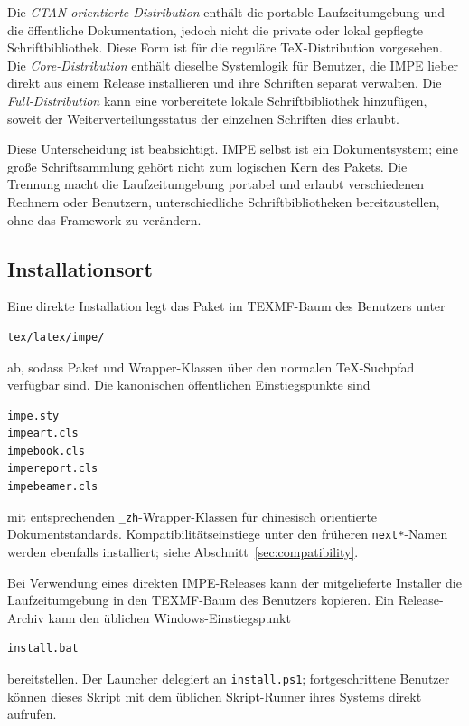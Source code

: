 \documentclass[11pt]{impeart}
\begin{document}
Die \emph{CTAN-orientierte Distribution} enthält die portable Laufzeitumgebung
und die öffentliche Dokumentation, jedoch nicht die private oder lokal
gepflegte Schriftbibliothek. Diese Form ist für die reguläre
\TeX{}-Distribution vorgesehen. Die \emph{Core-Distribution} enthält dieselbe
Systemlogik für Benutzer, die IMPE lieber direkt aus einem Release installieren
und ihre Schriften separat verwalten. Die \emph{Full-Distribution} kann eine
vorbereitete lokale Schriftbibliothek hinzufügen, soweit der
Weiterverteilungsstatus der einzelnen Schriften dies erlaubt.

Diese Unterscheidung ist beabsichtigt. IMPE selbst ist ein Dokumentsystem; eine
große Schriftsammlung gehört nicht zum logischen Kern des Pakets. Die Trennung
macht die Laufzeitumgebung portabel und erlaubt verschiedenen Rechnern oder
Benutzern, unterschiedliche Schriftbibliotheken bereitzustellen, ohne das
Framework zu verändern.

\subsection{Installationsort}

Eine direkte Installation legt das Paket im TEXMF-Baum des Benutzers unter

\begin{verbatim}
tex/latex/impe/
\end{verbatim}

ab, sodass Paket und Wrapper-Klassen über den normalen \TeX{}-Suchpfad
verfügbar sind. Die kanonischen öffentlichen Einstiegspunkte sind

\begin{verbatim}
impe.sty
impeart.cls
impebook.cls
impereport.cls
impebeamer.cls
\end{verbatim}

mit entsprechenden \texttt{\_zh}-Wrapper-Klassen für chinesisch orientierte
Dokumentstandards. Kompatibilitätseinstiege unter den früheren
\texttt{next*}-Namen werden ebenfalls installiert; siehe
Abschnitt~\ref{sec:compatibility}.

Bei Verwendung eines direkten IMPE-Releases kann der mitgelieferte Installer
die Laufzeitumgebung in den TEXMF-Baum des Benutzers kopieren. Ein
Release-Archiv kann den üblichen Windows-Einstiegspunkt

\begin{verbatim}
install.bat
\end{verbatim}

bereitstellen. Der Launcher delegiert an \texttt{install.ps1}; fortgeschrittene
Benutzer können dieses Skript mit dem üblichen Skript-Runner ihres Systems
direkt aufrufen.
\end{document}
